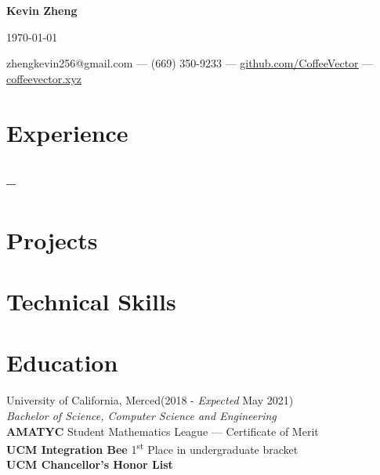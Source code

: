 \documentclass[letterpaper,12pt]{article}
\makeatletter
\newcommand\textbox[1]{%
    \parbox{.333\textwidth}{#1}%
}
\renewcommand{\maketitle}{
    \begin{center}
        \noindent\textbox{\hfill}\textbox{\hfil\bfseries\huge Kevin Zheng\hfil}\textbox{\hfill \today}
        {\faEnvelope \enskip zhengkevin256@gmail.com --- \faPhone \enskip (669) 350-9233 --- \faGithub \enskip \underline{\color{blue}\href{https://github.com/CoffeeVector}{github.com/CoffeeVector}} --- \faChain \enskip \underline{\color{blue}\href{https://coffeevector.xyz}{coffeevector.xyz}}}
    \end{center} }
\makeatother
\begin{document}
\maketitle
\section{Experience}
    \subsection{ -- \null\hfill {}}
    \vspace*{-2mm}
\section{Projects}
    \subsection{\null\hfill {}}
    \vspace*{-2mm}
\section{Technical Skills}
    \subsection{}
    \vspace*{-4mm}
\section{Education}
University of California, Merced\null\hfill(2018 - \emph{Expected} May 2021)\\
           \emph{Bachelor of Science, Computer Science and Engineering}
    \\\textbf{AMATYC} Student Mathematics League --- Certificate of Merit\\
    \textbf{UCM Integration Bee} 1\textsuperscript{st} Place in undergraduate bracket\\
    \textbf{UCM Chancellor's Honor List}
    \vspace*{-2mm}
%
\end{document}
